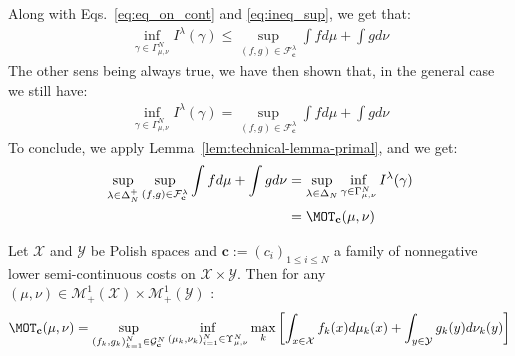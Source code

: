 \begin{prv*}
Along with Eqs.~\ref{eq:eq_on_cont} and \ref{eq:ineq_sup}, we get that:
\begin{align*}
\inf_{\gamma\in \Gamma^N_{\mu,\nu}}I^\lambda(\gamma)\leq\sup\limits_{(f,g)\in\mathcal{F}^\lambda_\mathbf{c}}\int fd\mu+\int gd\nu
\end{align*}
The other sens being always true, we have then  shown that, in the general case we still have:
\begin{align*}
    \inf_{\gamma\in \Gamma^N_{\mu,\nu}}I^\lambda(\gamma)=\sup\limits_{(f,g)\in\mathcal{F}^\lambda_\mathbf{c}}\int fd\mu+\int gd\nu
\end{align*}
To conclude, we apply Lemma~\ref{lem:technical-lemma-primal}, and we get: 
\begin{align*}
\sup_{\lambda\in\Delta^+_N} \sup\limits_{(f,g)\in\mathcal{F}^\lambda_\mathbf{c}}\int fd\mu+\int gd\nu &=\sup_{\lambda\in\Delta_N} \inf_{\gamma\in \Gamma^N_{\mu,\nu}}I^\lambda(\gamma)\\
&= \MOT_\mathbf{c}(\mu,\nu)\\
\end{align*}


\end{prv*}



\begin{prop}
\label{dual-interpret-max}
Let $\mathcal{X}$ and $\mathcal{Y}$ be Polish spaces and $\mathbf{c}:=(c_i)_{1\leq i\leq N}$ a family of nonnegative lower semi-continuous costs on $\mathcal{X}\times \mathcal{Y}$. Then for any $(\mu,\nu)\in\mathcal{M}_+^{1}(\mathcal{X})\times\mathcal{M}_+^{1}(\mathcal{Y})$ :
\begin{align*}
    \MOT_{\mathbf{c}}(\mu,\nu)=
     \sup\limits_{(f_k,g_k)_{k=1}^N\in  \mathcal{G}^{N}_{\mathbf{c}}} \inf_{(\mu_k,\nu_k)_{i=1}^N\in\Upsilon_{\mu,\nu}^N }\max_k \left[\int_{x\in\mathcal{X}} f_k(x)d\mu_k(x)+ \int_{y\in\mathcal{Y}} g_k(y)d\nu_k(y)\right]
\end{align*}
  
\end{prop}

